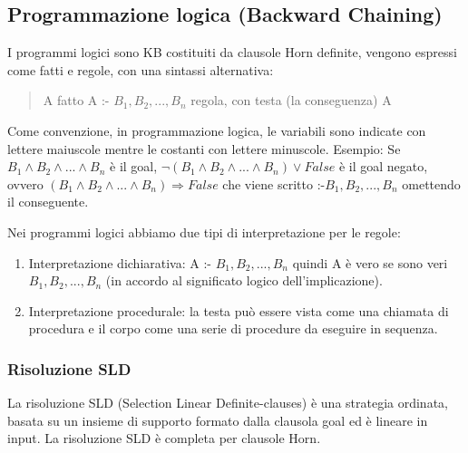 \documentclass{article}
\begin{document}
\subsection{Programmazione logica (Backward Chaining)}
I programmi logici sono KB costituiti da clausole Horn definite, vengono espressi come fatti e regole, con una sintassi alternativa:
\begin{quote}
    A \quad fatto \newline
 	A :- $B_1, B_2, ... , B_n$ \quad regola, con testa (la conseguenza) A
\end{quote}
Come convenzione, in programmazione logica, le variabili sono indicate con lettere maiuscole mentre le costanti con lettere minuscole. \newline
Esempio: Se\newline
$B_1 \land B_2 \land ... \land B_n$ \quad è il goal, \newline
$\neg (B_1 \land B_2 \land ... \land B_n) \lor False$ \quad è il goal negato, ovvero \newline
$(B_1 \land B_2 \land ... \land B_n) \Rightarrow False$ \quad che viene scritto \newline
:-$B_1, B_2, ..., B_n$ \quad omettendo il conseguente. \clearpage

Nei programmi logici abbiamo due tipi di interpretazione per le regole:
\begin{enumerate}
    \item Interpretazione dichiarativa: A :- $B_1, B_2, ..., B_n$ quindi A è vero se sono veri $B_1, B_2, ..., B_n$ (in accordo al significato logico dell'implicazione).
    \item Interpretazione procedurale: la testa può essere vista come una chiamata di procedura e il corpo come una serie di procedure da eseguire in sequenza.
\end{enumerate}

\subsubsection{Risoluzione SLD}
La risoluzione SLD (Selection Linear Definite-clauses) è una strategia ordinata, basata su un insieme di supporto formato dalla clausola goal ed è lineare in input. La risoluzione SLD è completa per clausole Horn.
\end{document}
